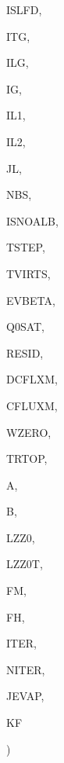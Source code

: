 {\begin{DoxyParamCaption}
\item[{integer}]{I\+S\+L\+F\+D, }
\item[{integer}]{I\+T\+G, }
\item[{integer}]{I\+L\+G, }
\item[{integer}]{I\+G, }
\item[{integer}]{I\+L1, }
\item[{integer}]{I\+L2, }
\item[{integer}]{J\+L, }
\item[{integer}]{N\+B\+S, }
\item[{integer}]{I\+S\+N\+O\+A\+L\+B, }
\item[{real, dimension (ilg)}]{T\+S\+T\+E\+P, }
\item[{real, dimension(ilg)}]{T\+V\+I\+R\+T\+S, }
\item[{real, dimension(ilg)}]{E\+V\+B\+E\+T\+A, }
\item[{real, dimension (ilg)}]{Q0\+S\+A\+T, }
\item[{real, dimension (ilg)}]{R\+E\+S\+I\+D, }
\item[{real, dimension(ilg)}]{D\+C\+F\+L\+X\+M, }
\item[{real, dimension(ilg)}]{C\+F\+L\+U\+X\+M, }
\item[{real, dimension (ilg)}]{W\+Z\+E\+R\+O, }
\item[{real, dimension  (ilg,nbs)}]{T\+R\+T\+O\+P, }
\item[{real, dimension     (ilg)}]{A, }
\item[{real, dimension     (ilg)}]{B, }
\item[{real, dimension  (ilg)}]{L\+Z\+Z0, }
\item[{real, dimension (ilg)}]{L\+Z\+Z0\+T, }
\item[{real, dimension    (ilg)}]{F\+M, }
\item[{real, dimension    (ilg)}]{F\+H, }
\item[{integer, dimension  (ilg)}]{I\+T\+E\+R, }
\item[{integer, dimension (ilg)}]{N\+I\+T\+E\+R, }
\item[{integer, dimension (ilg)}]{J\+E\+V\+A\+P, }
\item[{integer, dimension    (ilg)}]{K\+F}
\end{DoxyParamCaption}
)}\label{TSOLVE_8f_afed2fb96199ad1f2aeed9442633cd53f}

